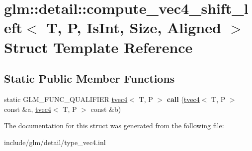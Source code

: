 \hypertarget{structglm_1_1detail_1_1compute__vec4__shift__left}{}\section{glm\+:\+:detail\+:\+:compute\+\_\+vec4\+\_\+shift\+\_\+left$<$ T, P, Is\+Int, Size, Aligned $>$ Struct Template Reference}
\label{structglm_1_1detail_1_1compute__vec4__shift__left}
\subsection*{Static Public Member Functions}
\begin{DoxyCompactItemize}
\item 
\mbox{\label{structglm_1_1detail_1_1compute__vec4__shift__left_aeecda8303fb8efb3bf724be43cc15329}} 
static G\+L\+M\+\_\+\+F\+U\+N\+C\+\_\+\+Q\+U\+A\+L\+I\+F\+I\+ER \hyperlink{structglm_1_1tvec4}{tvec4}$<$ T, P $>$ {\bfseries call} (\hyperlink{structglm_1_1tvec4}{tvec4}$<$ T, P $>$ const \&a, \hyperlink{structglm_1_1tvec4}{tvec4}$<$ T, P $>$ const \&b)
\end{DoxyCompactItemize}


The documentation for this struct was generated from the following file\+:\begin{DoxyCompactItemize}
\item 
include/glm/detail/type\+\_\+vec4.\+inl\end{DoxyCompactItemize}
